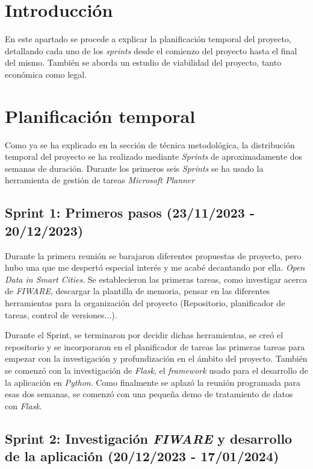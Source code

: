 
\section{Introducción}

En este apartado se procede a explicar la planificación temporal del proyecto, detallando cada uno de los \textit{sprints} desde el comienzo del proyecto hasta el final del mismo. También se aborda un estudio de viabilidad del proyecto, tanto económica como legal.

\section{Planificación temporal}

Como ya se ha explicado en la sección de técnica metodológica, la distribución temporal del proyecto se ha realizado mediante \textit{Sprints} de aproximadamente dos semanas de duración.
Durante los primeros seis \textit{Sprints} se ha usado la herramienta de gestión de tareas \textit{Microsoft Planner}

\subsection{Sprint 1: Primeros pasos (23/11/2023 - 20/12/2023)}
Durante la primera reunión se barajaron diferentes propuestas de proyecto, pero hubo una que me despertó especial interés y me acabé decantando por ella. \textit{Open Data in Smart Cities}.
Se establecieron las primeras tareas, como investigar acerca de \textit{FIWARE}, descargar la plantilla de memoria, pensar en las diferentes herramientas para la organización del proyecto (Repositorio, planificador de tareas, control de versiones...). 

Durante el Sprint, se terminaron por decidir dichas herramientas, se creó el repositorio y se incorporaron en el planificador de tareas las primeras tareas para empezar con la investigación y profundización en el ámbito del proyecto.
También se comenzó con la investigación de \textit{Flask}, el \textit{framework} usado para el desarrollo de la aplicación en \textit{Python}. Como finalmente se aplazó la reunión programada para esas dos semanas, se comenzó con una pequeña demo de tratamiento de datos con \textit{Flask}.


\subsection{Sprint 2: Investigación \textit{FIWARE} y desarrollo de la aplicación (20/12/2023 - 17/01/2024)}

